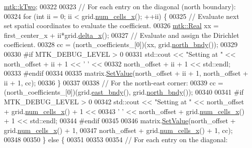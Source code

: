 \begin{DoxyCode}
      \hyperlink{group__c01-roots_gaf39c2d851a2db744f4feb1c5ab3ec2cf}{mtk::kTwo};
00322 
00323     \textcolor{comment}{// For each entry on the diagonal (north boundary):}
00324     \textcolor{keywordflow}{for} (\textcolor{keywordtype}{int} ii = 0; ii < grid.\hyperlink{classmtk_1_1UniStgGrid2D_a2d182866a398aba8e4829590e85bf939}{num\_cells\_x}(); ++ii) \{
00325       \textcolor{comment}{// Evaluate next set spatial coordinates to evaluate the coefficient.}
00326       \hyperlink{group__c01-roots_gac080bbbf5cbb5502c9f00405f894857d}{mtk::Real} xx = first\_center\_x + ii*grid.\hyperlink{classmtk_1_1UniStgGrid2D_aca4710004c4a7da6a9e8fd6ab32a691f}{delta\_x}();
00327       \textcolor{comment}{// Evaluate and assign the Dirichlet coefficient.}
00328       cc = (north\_coefficients\_[0])(xx, grid.\hyperlink{classmtk_1_1UniStgGrid2D_afe1ead253cdeb5503e0489eba8fd84e2}{north\_bndy}());
00329 
00330 \textcolor{preprocessor}{      #if MTK\_DEBUG\_LEVEL > 0}
00331       std::cout << \textcolor{stringliteral}{"Setting at "} << north\_offset + ii + 1 << \textcolor{charliteral}{' '} <<
00332         north\_offset + ii + 1 << std::endl;
00333 \textcolor{preprocessor}{      #endif}
00334 
00335       matrix.\hyperlink{classmtk_1_1DenseMatrix_a784ce5784109ac86bfb9d8562b334b13}{SetValue}(north\_offset + ii + 1, north\_offset + ii + 1, cc);
00336     \}
00337 
00338     \textcolor{comment}{// For the north-east corner:}
00339     cc = (north\_coefficients\_[0])(grid.\hyperlink{classmtk_1_1UniStgGrid2D_a03f689eb29a6369b82ce1207c655d5ff}{east\_bndy}(), grid.\hyperlink{classmtk_1_1UniStgGrid2D_afe1ead253cdeb5503e0489eba8fd84e2}{north\_bndy}());
00340 
00341 \textcolor{preprocessor}{    #if MTK\_DEBUG\_LEVEL > 0}
00342     std::cout << \textcolor{stringliteral}{"Setting at "} << north\_offset + grid.\hyperlink{classmtk_1_1UniStgGrid2D_a2d182866a398aba8e4829590e85bf939}{num\_cells\_x}() + 1 <<
00343       \textcolor{charliteral}{' '} << north\_offset + grid.\hyperlink{classmtk_1_1UniStgGrid2D_a2d182866a398aba8e4829590e85bf939}{num\_cells\_x}() + 1 << std::endl;
00344 \textcolor{preprocessor}{    #endif}
00345 
00346     matrix.\hyperlink{classmtk_1_1DenseMatrix_a784ce5784109ac86bfb9d8562b334b13}{SetValue}(north\_offset + grid.\hyperlink{classmtk_1_1UniStgGrid2D_a2d182866a398aba8e4829590e85bf939}{num\_cells\_x}() + 1,
00347                     north\_offset + grid.\hyperlink{classmtk_1_1UniStgGrid2D_a2d182866a398aba8e4829590e85bf939}{num\_cells\_x}() + 1, cc);
00348 
00350   \} \textcolor{keywordflow}{else} \{
00351 
00353 
00354     \textcolor{comment}{// For each entry on the diagonal:}

\end{DoxyCode}
